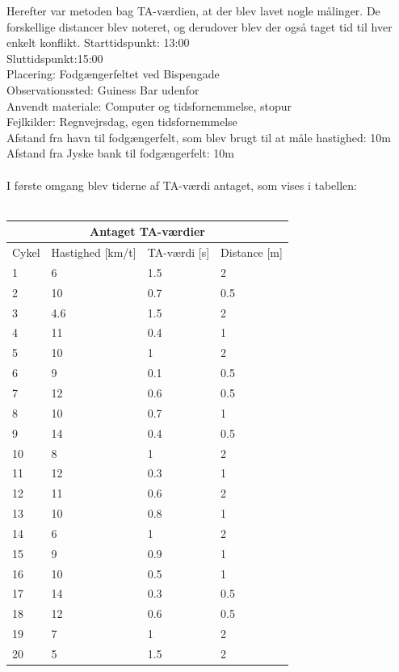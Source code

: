 Herefter var metoden bag TA-værdien, at der blev lavet nogle målinger. De forskellige distancer blev noteret, og derudover blev der også taget tid til hver enkelt konflikt.
Starttidspunkt: 13:00
\\
Sluttidspunkt:15:00
\\
Placering: Fodgængerfeltet ved Bispengade
\\
Observationssted: Guiness Bar udenfor
\\
Anvendt materiale: Computer og tidsfornemmelse, stopur
\\
Fejlkilder: Regnvejrsdag, egen tidsfornemmelse
\\
Afstand fra havn til fodgængerfelt, som blev brugt til at måle hastighed: 10m
\\
Afstand fra Jyske bank til fodgængerfelt: 10m
\\\\
I første omgang blev tiderne af TA-værdi antaget, som vises i tabellen:
\\\\
\begin{tabular}{ |p{1cm}|p{4cm}|p{4cm}|p{4cm}|  }
\hline
\multicolumn{4}{|c|}{Antaget TA-værdier} \\
\hline
Cykel & Hastighed [km/t] & TA-værdi [s] & Distance [m] \\
\hline
1 & 6   & 1.5 & 2 \\
2 & 10  & 0.7 & 0.5 \\
3 & 4.6 & 1.5 & 2 \\
4 & 11  & 0.4 & 1 \\
5 & 10  & 1 & 2 \\
6 & 9   & 0.1 & 0.5 \\
7 & 12  & 0.6 & 0.5 \\
8 & 10  & 0.7 & 1 \\
9 & 14  & 0.4 & 0.5 \\
10 & 8  & 1   & 2 \\
11 & 12 &0.3  &  1 \\
12 & 11 & 0.6 &   2\\
13 & 10 & 0.8 & 1\\
14 & 6  & 1   & 2\\
15 & 9  & 0.9 & 1\\
16 & 10 & 0.5 & 1\\
17 & 14 & 0.3 &0.5\\
18 & 12 & 0.6 & 0.5\\
19 & 7  & 1 & 2\\
20 & 5  & 1.5 & 2\\
\hline
\end{tabular}




